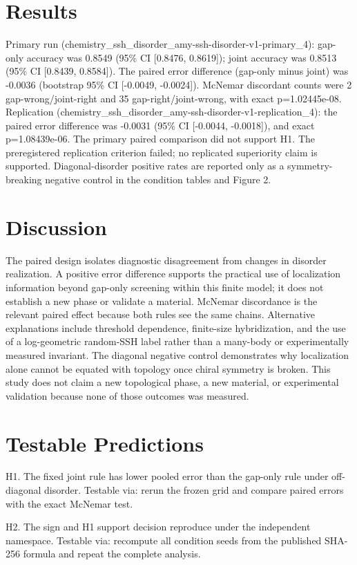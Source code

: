 \documentclass[11pt,a4paper]{article}
\begin{document}
\section{Results}
Primary run (chemistry\_ssh\_disorder\_amy-ssh-disorder-v1-primary\_4): gap-only accuracy was 0.8549 (95\% CI [0.8476, 0.8619]); joint accuracy was 0.8513 (95\% CI [0.8439, 0.8584]). The paired error difference (gap-only minus joint) was -0.0036 (bootstrap 95\% CI [-0.0049, -0.0024]). McNemar discordant counts were 2 gap-wrong/joint-right and 35 gap-right/joint-wrong, with exact p=1.02445e-08. Replication (chemistry\_ssh\_disorder\_amy-ssh-disorder-v1-replication\_4): the paired error difference was -0.0031 (95\% CI [-0.0044, -0.0018]), and exact p=1.08439e-06. The primary paired comparison did not support H1. The preregistered replication criterion failed; no replicated superiority claim is supported. Diagonal-disorder positive rates are reported only as a symmetry-breaking negative control in the condition tables and Figure 2.


\section{Discussion}
The paired design isolates diagnostic disagreement from changes in disorder realization. A positive error difference supports the practical use of localization information beyond gap-only screening within this finite model; it does not establish a new phase or validate a material. McNemar discordance is the relevant paired effect because both rules see the same chains. Alternative explanations include threshold dependence, finite-size hybridization, and the use of a log-geometric random-SSH label rather than a many-body or experimentally measured invariant. The diagonal negative control demonstrates why localization alone cannot be equated with topology once chiral symmetry is broken. This study does not claim a new topological phase, a new material, or experimental validation because none of those outcomes was measured.


\section{Testable Predictions}
H1. The fixed joint rule has lower pooled error than the gap-only rule under off-diagonal disorder. Testable via: rerun the frozen grid and compare paired errors with the exact McNemar test.

H2. The sign and H1 support decision reproduce under the independent namespace. Testable via: recompute all condition seeds from the published SHA-256 formula and repeat the complete analysis.
\end{document}
